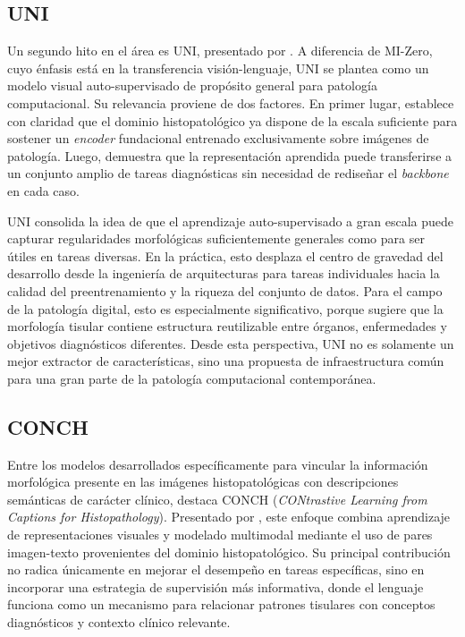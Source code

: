 \subsection{UNI}

Un segundo hito en el área es UNI, presentado por \textcite{chen2024uni}. A diferencia de MI-Zero, cuyo énfasis está en la transferencia visión-lenguaje, UNI se plantea como un modelo visual auto-supervisado de propósito general para patología computacional. Su relevancia proviene de dos factores. En primer lugar, establece con claridad que el dominio histopatológico ya dispone de la escala suficiente para sostener un \textit{encoder} fundacional entrenado exclusivamente sobre imágenes de patología. Luego, demuestra que la representación aprendida puede transferirse a un conjunto amplio de tareas diagnósticas sin necesidad de rediseñar el \textit{backbone} en cada caso.

UNI consolida la idea de que el aprendizaje auto-supervisado a gran escala puede capturar regularidades morfológicas suficientemente generales como para ser útiles en tareas diversas. En la práctica, esto desplaza el centro de gravedad del desarrollo desde la ingeniería de arquitecturas para tareas individuales hacia la calidad del preentrenamiento y la riqueza del conjunto de datos. Para el campo de la patología digital, esto es especialmente significativo, porque sugiere que la morfología tisular contiene estructura reutilizable entre órganos, enfermedades y objetivos diagnósticos diferentes. Desde esta perspectiva, UNI no es solamente un mejor extractor de características, sino una propuesta de infraestructura común para una gran parte de la patología computacional contemporánea.


\subsection{CONCH}

Entre los modelos desarrollados específicamente para vincular la información morfológica presente en las imágenes histopatológicas con descripciones semánticas de carácter clínico, destaca CONCH (\textit{CONtrastive Learning from Captions for Histopathology}). Presentado por \textcite{Lu2024}, este enfoque combina aprendizaje de representaciones visuales y modelado multimodal mediante el uso de pares imagen-texto provenientes del dominio histopatológico. Su principal contribución no radica únicamente en mejorar el desempeño en tareas específicas, sino en incorporar una estrategia de supervisión más informativa, donde el lenguaje funciona como un mecanismo para relacionar patrones tisulares con conceptos diagnósticos y contexto clínico relevante.

